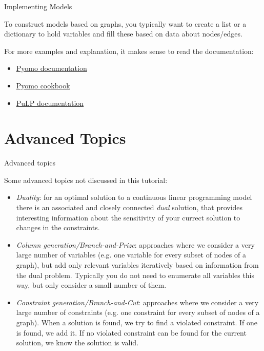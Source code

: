 \documentclass[10pt]{beamer}
\begin{document}
\begin{frame}[fragile]{Implementing Models}

To construct models based on graphs, you typically want to create a list or a dictionary to hold variables and fill these
based on data about nodes/edges.

For more examples and explanation, it makes sense to read the documentation:
\begin{itemize}
	\item \href{https://pyomo.readthedocs.io}{\color{cyan}\underline{Pyomo documentation}}
	\item \href{https://jckantor.github.io/ND-Pyomo-Cookbook/}{\color{cyan}\underline{Pyomo cookbook}}
	\item \href{https://coin-or.github.io/pulp/}{\color{cyan}\underline{PuLP documentation}}
\end{itemize}

\end{frame}

\section{Advanced Topics}

\begin{frame}[fragile]{Advanced topics}

Some advanced topics not discussed in this tutorial:

\begin{itemize}
	\item \emph{Duality}: \small for an optimal solution to a continuous linear programming model there is an associated and closely connected \emph{dual} solution, that provides interesting information about the sensitivity of your currect solution to changes in the constraints.
	\item \emph{Column generation/Branch-and-Prize}: \small approaches where we consider a very large number of variables (e.g. one variable for every subset of nodes of a graph), but add only relevant variables iteratively based on information from the dual problem. Typically you do not need to enumerate all variables this way, but only consider a small number of them.
	\item \emph{Constraint generation/Branch-and-Cut}: \small approaches where we consider a very large number of constraints (e.g. one constraint for every subset of nodes of a graph). When a solution is found, we try to find a violated constraint. If one is found, we add it. If no violated constraint can be found for the current solution, we know the solution is valid.
\end{itemize}

\end{frame}
\end{document}
